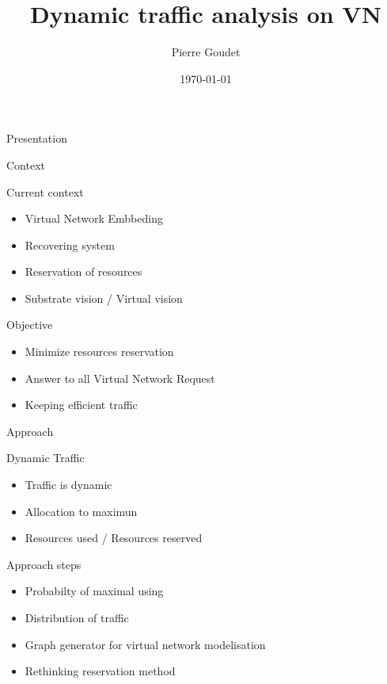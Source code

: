 \documentclass{beamer}
\title[Advanced network architecture laboratory]{Dynamic traffic analysis on VN}
\author[]{Pierre Goudet}
\institute[Osaka University]{}
\date{\today}
\begin{document}
\begin{frame}{Presentation}
  \titlepage
\end{frame}

\begin{frame}{Context}
  \begin{block}{Current context}
    \begin{itemize}
    \item Virtual Network Embbeding
    \item Recovering system
    \item Reservation of resources
    \item Substrate vision / Virtual vision
    \end{itemize}
  \end{block}

  \begin{block}{Objective}
    \begin{itemize}
    \item Minimize resources reservation
    \item Answer to all Virtual Network Request
    \item Keeping efficient traffic
    \end{itemize}  
  \end{block}
\end{frame}

\begin{frame}{Approach}
  \begin{block}{Dynamic Traffic}
    \begin{itemize}
    \item Traffic is dynamic
    \item Allocation to maximun
    \item Resources used / Resources reserved
    \end{itemize}
  \end{block}

  \begin{block}{Approach steps}
    \begin{itemize}
    \item{Probabilty of maximal using}
    \item{Distribution of traffic}
    \item{Graph generator for virtual network modelisation}
    \item{Rethinking reservation method}
    \end{itemize}
  \end{block}
\end{frame}
\end{document}
